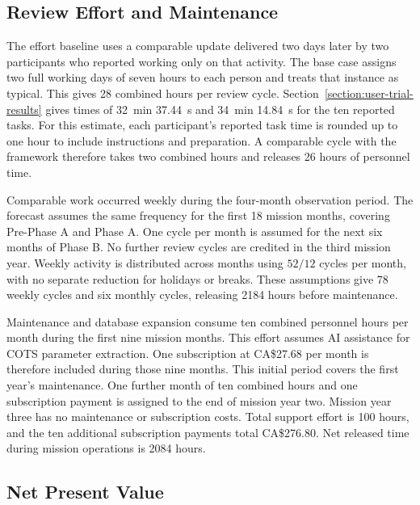 \subsection{Review Effort and Maintenance}

The effort baseline uses a comparable update delivered two days later by two participants who reported working only on that activity.
The base case assigns two full working days of seven hours to each person and treats that instance as typical.
This gives 28 combined hours per review cycle.
Section~\ref{section:user-trial-results} gives times of 32~min 37.44~s and 34~min 14.84~s for the ten reported tasks.
For this estimate, each participant's reported task time is rounded up to one hour to include instructions and preparation.
A comparable cycle with the framework therefore takes two combined hours and releases 26 hours of personnel time.

Comparable work occurred weekly during the four-month observation period.
The forecast assumes the same frequency for the first 18 mission months, covering Pre-Phase A and Phase A.
One cycle per month is assumed for the next six months of Phase B.
No further review cycles are credited in the third mission year.
Weekly activity is distributed across months using $52/12$ cycles per month, with no separate reduction for holidays or breaks.
These assumptions give 78 weekly cycles and six monthly cycles, releasing 2184 hours before maintenance.

Maintenance and database expansion consume ten combined personnel hours per month during the first nine mission months.
This effort assumes AI assistance for COTS parameter extraction.
One subscription at CA\$27.68 per month is therefore included during those nine months.
This initial period covers the first year's maintenance.
One further month of ten combined hours and one subscription payment is assigned to the end of mission year two.
Mission year three has no maintenance or subscription costs.
Total support effort is 100 hours, and the ten additional subscription payments total CA\$276.80.
Net released time during mission operations is 2084 hours.

\subsection{Net Present Value}

